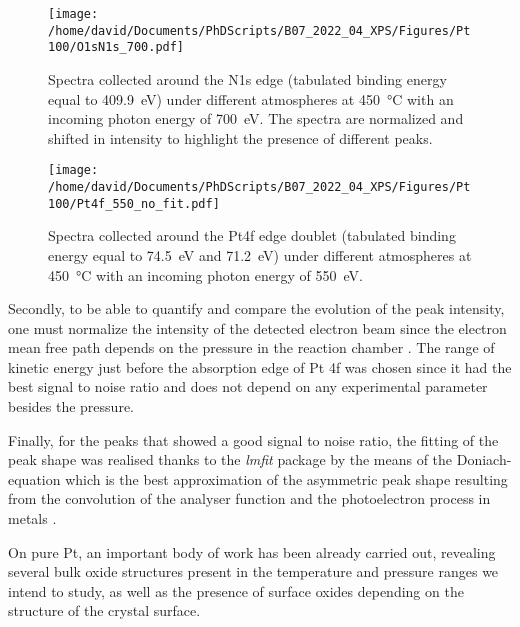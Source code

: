 \begin{figure}[!htb]
    \centering
    \texttt{[image: /home/david/Documents/PhDScripts/B07\_2022\_04\_XPS/Figures/Pt100/O1sN1s\_700.pdf]}
    \caption{
        Spectra collected around the N1s edge (tabulated binding energy equal to \qty{409.9}{\eV}) under different atmospheres at \qty{450}{\degreeCelsius} with an incoming photon energy of \qty{700}{\eV}.
        The spectra are normalized and shifted in intensity to highlight the presence of different peaks.
    }
    \label{fig:O1sN1sPt100}
\end{figure}

\begin{figure}[!htb]
    \centering
    \texttt{[image: /home/david/Documents/PhDScripts/B07\_2022\_04\_XPS/Figures/Pt100/Pt4f\_550\_no\_fit.pdf]}
    \caption{
    	Spectra collected around the Pt4f edge doublet (tabulated binding energy equal to \qty{74.5}{\eV} and \qty{71.2}{\eV}) under different atmospheres at \qty{450}{\degreeCelsius} with an incoming photon energy of \qty{550}{\eV}.
    }
    \label{fig:Pt4fPt100}
\end{figure}

Secondly, to be able to quantify and compare the evolution of the peak intensity, one must normalize the intensity of the detected electron beam since the electron mean free path depends on the pressure in the reaction chamber \parencite{Willmott}.
The range of kinetic energy just before the absorption edge of Pt 4f was chosen since it had the best signal to noise ratio and does not depend on any experimental parameter besides the pressure.

Finally, for the peaks that showed a good signal to noise ratio, the fitting of the peak shape was realised thanks to the \textit{lmfit} \parencite{Newville2016} package by the means of the Doniach-equation which is the best approximation of the asymmetric peak shape resulting from the convolution of the analyser function and the photoelectron process in metals \parencite{Doniach_1970}.


On pure Pt, an important body of work has been already carried out, revealing several bulk oxide structures present in the temperature and
pressure ranges we intend to study, as well as the presence of surface oxides depending on the structure of the crystal surface.